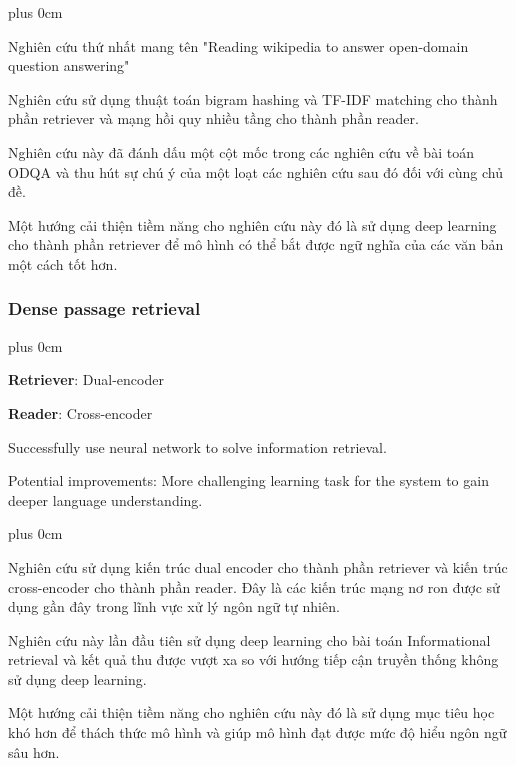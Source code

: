 \documentclass[11pt]{beamer}
\renewcommand{\raggedright}{\leftskip=0pt \rightskip=0pt plus 0cm}
\let\olditemize=\itemize
\renewenvironment{itemize}{\olditemize\raggedright}{\endlist}
\begin{document}
\begin{frame}
\begin{itemize}
	\item Nghiên cứu thứ nhất mang tên "Reading wikipedia to answer open-domain question answering"
	\item Nghiên cứu sử dụng thuật toán bigram hashing và TF-IDF matching cho thành phần retriever và mạng hồi quy nhiều tầng cho thành phần reader.
	\item Nghiên cứu này đã đánh dấu một cột mốc trong các nghiên cứu về bài toán ODQA và thu hút sự chú ý của một loạt các nghiên cứu sau đó đối với cùng chủ đề.
	\item Một hướng cải thiện tiềm năng cho nghiên cứu này đó là sử dụng deep learning cho thành phần retriever để mô hình có thể bắt được ngữ nghĩa của các văn bản một cách tốt hơn.
\end{itemize}
\end{frame}
\begin{frame}
	\frametitle{Dense passage retrieval}
	\begin{itemize}
		\item \textbf{Retriever}: Dual-encoder
		\item \textbf{Reader}: Cross-encoder
		\item Successfully use neural network to solve information retrieval.
		\item Potential improvements: More challenging learning task for the system to gain deeper language understanding.
	\end{itemize}
\end{frame}
\begin{frame}
\begin{itemize}
	\item Nghiên cứu sử dụng kiến trúc dual encoder cho thành phần retriever và kiến trúc cross-encoder cho thành phần reader. Đây là các kiến trúc mạng nơ ron được sử dụng gần đây trong lĩnh vực xử lý ngôn ngữ tự nhiên.
	\item Nghiên cứu này lần đầu tiên sử dụng deep learning cho bài toán Informational retrieval và kết quả thu được vượt xa so với hướng tiếp cận truyền thống không sử dụng deep learning.
	\item Một hướng cải thiện tiềm năng cho nghiên cứu này đó là sử dụng mục tiêu học khó hơn để thách thức mô hình và giúp mô hình đạt được mức độ hiểu ngôn ngữ sâu hơn.
\end{itemize}
\end{frame}
\end{document}
